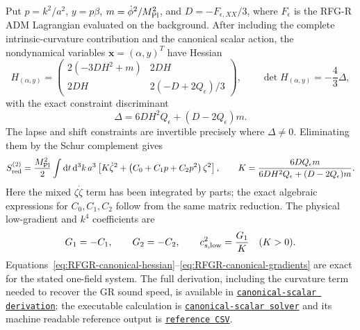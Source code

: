 \documentclass[11pt,a4paper]{article}
\renewcommand{\dd}{\mathrm{d}}
\newcommand{\mpl}{M_{\rm Pl}}
\newcommand{\RFGRepoURL}{https://github.com/MartinPetrasek123/MartinPetrasek123}
\newcommand{\RFGRepoNamed}[2]{\href{\RFGRepoURL/blob/main/r-universe-complete-chain/rfg-r-completion/r\_universe\_completion/#1}{\texttt{#2}}}
\begin{document}
Put \(p=k^2/a^2\), \(y=p\beta\),
\(m=\dot\phi^2/\mpl^2\), and
\(D=-F_{\epsilon,XX}/3\), where \(F_\epsilon\) is the RFG-R ADM
Lagrangian evaluated on the background.  After including the complete
intrinsic-curvature contribution and the canonical scalar action, the
nondynamical variables \(\mathbf{x}=(\alpha,y)^T\) have Hessian
\begin{equation}
 H_{(\alpha,y)}=
 \begin{pmatrix}
  2(-3DH^2+m) & 2DH\\
  2DH & 2(-D+2Q_\epsilon)/3
 \end{pmatrix},
 \qquad
 \det H_{(\alpha,y)}=-\frac{4}{3}\Delta,
 \label{eq:RFGR-canonical-hessian}
\end{equation}
with the exact constraint discriminant
\begin{equation}
 \Delta=6DH^2Q_\epsilon+(D-2Q_\epsilon)m.
 \label{eq:RFGR-canonical-delta}
\end{equation}
The lapse and shift constraints are invertible precisely where
\(\Delta\ne0\).  Eliminating them by the Schur complement gives
\begin{equation}
 S_{\rm red}^{(2)}=\frac{\mpl^2}{2}\int\dd t\,\dd^3k\,a^3
 \left[K\dot\zeta^2+
 \left(C_0+C_1p+C_2p^2\right)\zeta^2\right],
 \qquad
 K=\frac{6DQ_\epsilon m}
 {6DH^2Q_\epsilon+(D-2Q_\epsilon)m}.
 \label{eq:RFGR-canonical-reduced}
\end{equation}
Here the mixed \(\zeta\dot\zeta\) term has been integrated by parts;
the exact algebraic expressions for \(C_0,C_1,C_2\) follow from the same
matrix reduction.  The physical low-gradient and \(k^4\) coefficients are
\begin{equation}
 G_1=-C_1,\qquad G_2=-C_2,\qquad
 c_{s,\rm low}^2=\frac{G_1}{K}\quad(K>0).
 \label{eq:RFGR-canonical-gradients}
\end{equation}
Equations~\eqref{eq:RFGR-canonical-hessian}--\eqref{eq:RFGR-canonical-gradients}
are exact for the stated one-field system.  The full derivation, including
the curvature term needed to recover the GR sound speed, is available in
\RFGRepoNamed{docs/canonical\_scalar\_reduction.md}{canonical-scalar derivation}; the executable
calculation is \RFGRepoNamed{scripts/canonical\_scalar.py}{canonical-scalar solver} and its machine
readable reference output is
\RFGRepoNamed{generated/tables/canonical\_scalar\_reference.csv}{reference CSV}.
\end{document}

